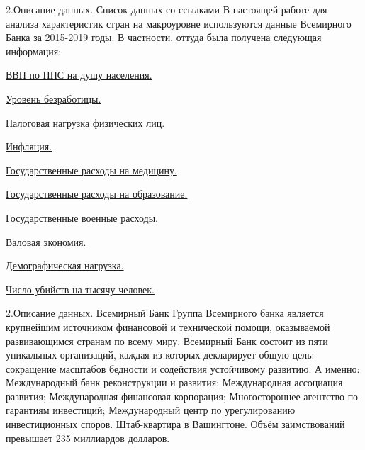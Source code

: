 \documentclass[aspectratio=169]{beamer}
\begin{document}
\begin{frame}{2.Описание данных. Список данных со ссылками}
В настоящей работе для анализа характеристик стран на макроуровне используются данные Всемирного Банка за 2015-2019 годы. В частности, оттуда была получена следующая информация:


      \item \href{https://data.worldbank.org/indicator/NY.GDP.PCAP.PP.CD}{ВВП по ППС на душу населения.}
        \item \href{https://data.worldbank.org/indicator/GB.XPD.RSDV.GD.ZS?view=chart}{Уровень безработицы.}
        \item \href{https://data.worldbank.org/indicator/IC.TAX.TOTL.CP.ZS?view=chart}{Налоговая нагрузка физических лиц.}
        \item \href{https://data.worldbank.org/indicator/FP.CPI.TOTL.ZG?view=chart}{Инфляция.}
        \item \href{https://data.worldbank.org/indicator/SH.XPD.CHEX.GD.ZS}{Государственные расходы на медицину.}
        \item \href{https://data.worldbank.org/indicator/SE.XPD.TOTL.GD.ZS?view=chart }{Государственные расходы на образование.}
        \item \href{https://data.worldbank.org/indicator/MS.MIL.XPND.GD.ZS}{Государственные военные расходы.}
        \item \href{https://data.worldbank.org/indicator/NY.GNS.ICTR.ZS?view=chart}{Валовая экономия.}
        \item \href{https://data.worldbank.org/indicator/SP.POP.DPND}{Демографическая нагрузка.}
        \item \href{https://data.worldbank.org/indicator/VC.IHR.PSRC.P5}{Число убийств на тысячу человек.}
        
\end{frame}

\begin{frame}{2.Описание данных. Всемирный Банк}
   Группа Всемирного банка является крупнейшим источником финансовой и технической помощи, оказываемой развивающимся странам по всему миру. Всемирный Банк состоит из пяти уникальных организаций, каждая из которых декларирует общую цель: сокращение масштабов бедности и содействия устойчивому развитию. А именно: Международный банк реконструкции и развития;
   Международная ассоциация развития; Международная финансовая корпорация; Многостороннее агентство по гарантиям инвестиций; Международный центр по урегулированию инвестиционных споров. Штаб-квартира в Вашингтоне. Объём заимствований превышает 235 миллиардов долларов. 
   
\end{frame}
\end{document}

